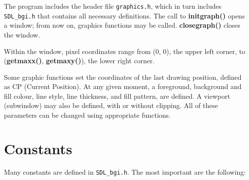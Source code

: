 \documentclass[a4paper,11pt]{article}
\newcommand{\func}[1]{\textbf{#1}}  %
\newcommand{\F}[1]{\texttt{#1}}     %
\begin{document}
The program includes the header file \F{graphics.h}, which in turn
includes \F{SDL\_bgi.h} that contains all necessary definitions. The
call to \func{initgraph()} opens a window; from now on, graphics
functions may be called. \func{closegraph()} closes the window.
 
Within the window, pixel coordinates range from (0, 0), the upper left
corner, to (\func{get\-maxx()}, \func{getmaxy()}), the lower right
corner.

Some graphic functions set the coordinates of the last drawing
position, defined as CP (Current Position). At any given moment, a
foreground, background and fill colour, line style, line thickness,
and fill pattern, are defined. A viewport (subwindow) may also be
defined, with or without clipping. All of these parameters can be
changed using appropriate functions.


\section{Constants}

Many constants are defined in \F{SDL\_bgi.h}. The most important are
the following:
\end{document}
